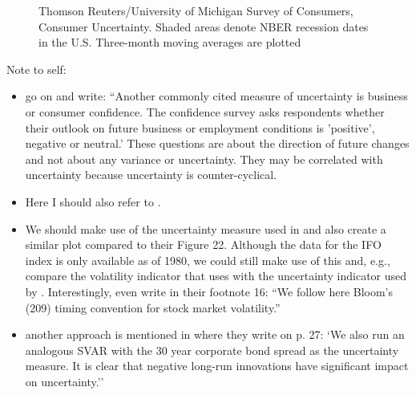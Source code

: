 \documentclass[a4paper,11pt,listof=nochaptergap,oneside,pointednumbers,bibtotoc,bigheadings,liststotoc]{scrbook}
\theoremstyle{mysatz}
\theoremstyle{mydefinition}
\theoremstyle{mybemerkung}
\begin{document}
\begin{figure}[!h]
   \centering
   \setlength\fboxsep{0pt}
   \setlength\fboxrule{0pt}
      \caption[Thomson Reuters/University of Michigan Survey of Consumers, Consumer Uncertainty.]{Thomson Reuters/University of Michigan Survey of Consumers, Consumer Uncertainty. Shaded areas denote NBER recession dates in the U.S. Three-month moving averages are plotted}   \label{fig:michigan_plot}
\end{figure}

\begingroup
    \fontsize{8pt}{12pt}\selectfont
    Note to self:
\begin{itemize}
	\item \citet{orlikandveldkamp:14} go on and write: ``Another commonly cited measure of uncertainty is business or consumer confidence. The confidence survey asks respondents whether their outlook on future business or employment conditions is 'positive', negative or neutral.' These questions are about the direction of future changes and not about any variance or uncertainty. They may be correlated with uncertainty because uncertainty is counter-cyclical.
	\item Here I should also refer to \citet{bachmannetal:13}.
	\item We should make use of the uncertainty measure used in \citet{bachmannetal:13} and also create a similar plot compared to their Figure 22. Although the data for the IFO index is only available as of 1980, we could still make use of this and, e.g., compare the volatility indicator that \citet{bloom:09} uses with the uncertainty indicator used by \citet{bachmannetal:13}. Interestingly, \citet{bachmannetal:13} even write in their footnote 16: ``We follow here Bloom's (209) timing convention for stock market volatility.''
	\item another approach is mentioned in \citet{bachmannetal:13} where they write on p. 27: `We also run an analogous SVAR with the 30 year corporate bond spread as the uncertainty measure. It is clear that negative long-run innovations have significant impact on uncertainty.''
\end{itemize}
\endgroup
\end{document}
